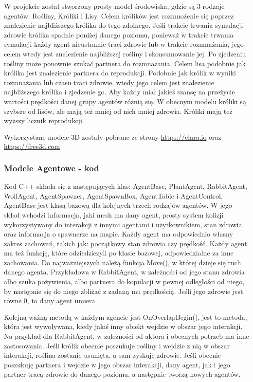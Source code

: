 \documentclass[a4paper,12pt,reqno]{article}
\begin{document}
W projekcie został stworzony prosty model środowiska, gdzie są 3 rodzaje agentów: Rośliny, Króliki i Lisy. Celem królików jest rozmnożenie się poprzez znalezienie najbliższego królika do tego zdolnego. Jeśli trakcie trwania symulacji zdrowie królika spadnie poniżej danego poziomu, ponieważ w trakcie trwania symulacji każdy agent nieustannie traci zdrowie lub w trakcie rozmnażania, jego celem wtedy jest znalezienie najbliższej rośliny i skonsumowanie jej. Po zjedzeniu rośliny może ponownie szukać partnera do rozmnażania.  Celem lisa podobnie jak królika jest znalezienie partnera do reprodukcji. Podobnie jak królik w wyniki rozmnażania lub czasu traci zdrowie, wtedy jego celem jest znalezienie najbliższego królika i zjedzenie go. Aby każdy miał jakieś szansę na przeżycie wartości prędkości danej grupy agentów różnią się. W obecnym modelu króliki są szybsze od lisów, ale mają też mniej od nich mniej zdrowia. Króliki mają też wyższy licznik reprodukcji.

Wykorzystane modele 3D zostały pobrane ze strony \url{https://clara.io} oraz \url{https://free3d.com}

\subsubsection{Modele Agentowe - kod}

Kod C++ składa się z następujących klas: AgentBase, PlantAgent, RabbitAgent, WolfAgent, AgentSpawner, AgentSpawnBox, AgentTable i AgentControl. 
AgentBase jest klasą bazową dla kolejnych trzech rodzajów agentów. W jego skład wchodzi informacja, jaki mesh ma dany agent, prosty system kolizji wykorzystywany do interakcji z innymi agentami i użytkownikiem, stan zdrowia oraz informacja o spawnerze na mapie. Każdy agent ma odpowiednio własny zakres zachowań, takich jak: początkowy stan zdrowia czy prędkość. Każdy agent ma też funkcję, które odziedziczyli po klasie bazowej, odpowiedzialne za inne zachowania. Do najważniejszych należą funkcja Move(), w której dzieje się ruch danego agenta. Przykładowa w RabbitAgent, w zależności od jego stanu zdrowia albo szuka pożywienia, albo partnera do kopulacji w pewnej odległości od niego, by następnie się do niego zbliżać z zadaną mu prędkością. Jeśli jego zdrowie jest równe 0, to dany agent umiera.



Kolejną ważną metodą w każdym agencie jest OnOverlapBegin(), jest to metoda, która jest wywoływana, kiedy jakiś inny obiekt wejdzie w obszar jego interakcji. Na przykład dla RabbitAgent, w zależności od aktora i obecnych potrzeb ma inne zastosowania. Jeśli królik obecnie poszukuje rośliny i wejdzie z nią w obszar interakcji, roślina zostanie usunięta, a sam zyskuję zdrowie. Jeśli obecnie poszukuję partnera i wejdzie w jego obszar interakcji, dany agent, jak i jego partner tracą zdrowie do danego poziomu, a następnie tworzą nowych agentów.
	
\end{document}
